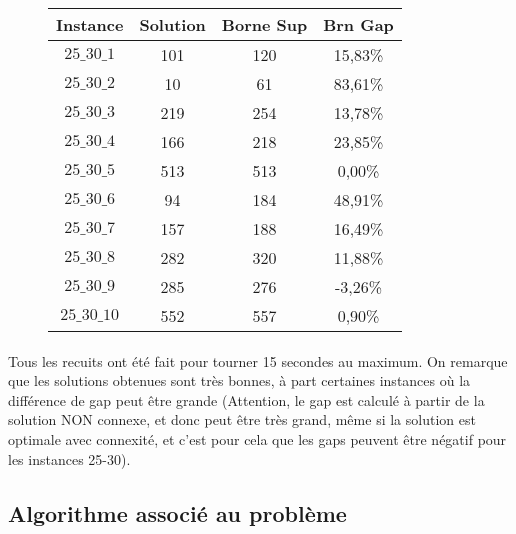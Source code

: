 \documentclass[a4paper, 11pt]{article} %
\begin{document}
\begin{center}
\begin{figure}[H]
      \begin{tabular}{|c|c|c|c|}
      \hline 
        Instance & Solution & Borne Sup & Brn Gap  \\ \hline
$25\_30\_1$ &  101 & 120 & 15,83\% \\ \hline
$25\_30\_2$ &  10 &  61 &  83,61\% \\ \hline
$25\_30\_3$ &  219 & 254 & 13,78\% \\ \hline
$25\_30\_4$ &  166 & 218 & 23,85\% \\ \hline
$25\_30\_5$ &  513 & 513 & 0,00\% \\ \hline
$25\_30\_6$ &  94 &  184 & 48,91\% \\ \hline
$25\_30\_7$ &  157 & 188 & 16,49\% \\ \hline
$25\_30\_8$ &  282 & 320 & 11,88\% \\ \hline
$25\_30\_9$ &  285 & 276 & -3,26\% \\ \hline
$25\_30\_10$ & 552 & 557 & 0,90\% \\ \hline
      \end{tabular}
\end{figure}
\end{center}

\paragraph*{}

Tous les recuits ont été fait pour tourner 15 secondes au maximum. On remarque que les solutions obtenues sont très bonnes, à part certaines instances où la différence de gap peut être grande (Attention, le gap est calculé à partir de la solution NON connexe, et donc peut être très grand, même si la solution est optimale avec connexité, et c'est pour cela que les gaps peuvent être négatif pour les instances 25-30).


\subsection{Algorithme associé au problème}
\end{document}
